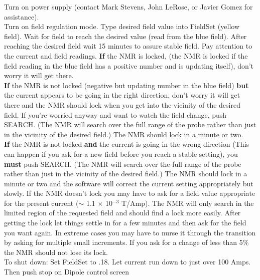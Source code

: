 {Turn on power supply (contact Mark Stevens, John LeRose, 
or Javier Gomez for assistance).\\


Turn on field regulation mode. Type desired field value into FieldSet 
(yellow field). Wait for field to reach the desired value (read from the blue 
field). After reaching the desired field wait 15 minutes to assure stable field.
Pay attention to the current and field readings.
{\bf If} the NMR is locked, (the NMR is locked if the field reading in 
the blue field has a positive number and is updating itself), don't 
worry it will get there.\\

{\bf If} the NMR is not locked (negative but updating number in the blue 
field) {\bf but} the current appears to be going in the right direction, 
 don't worry it will get there and the NMR should lock when you get into 
the vicinity of the desired field.  If you're worried anyway and want to 
watch the field change, push SEARCH.  (The NMR will search over the 
full range of the probe rather than just in the vicinity of the desired 
field.)  The NMR should lock in a minute or two.\\

{\bf If} the NMR is not locked {\bf and} the current is going in the 
wrong direction (This can happen if you ask for a new field before you 
reach a stable setting), you {\bf must} push SEARCH.  (The NMR will 
search over the full range of the probe rather than just in the vicinity 
of the desired field.)  The NMR should lock in a minute or two and the 
software will correct the current setting appropriately but slowly.  If 
the NMR doesn't lock you may have to ask for a field value appropriate 
for the present current ($\sim$ 1.1 $\times$ 10$^{-3}$ T/Amp).  The NMR 
will only search in the limited region of the requested field and should 
find a lock more easily.  After getting the lock let things settle in 
for a few minutes and then ask for the field you want again.  In extreme 
cases you may have to nurse it through the transition by asking for 
multiple small increments.  If you ask for a change of less than 5\% the 
NMR should not lose its lock.\\

\noindent To shut down:  Set FieldSet to .18.  Let current run down to 
just over 100 Amps.  Then push stop on Dipole control screen\\

}
